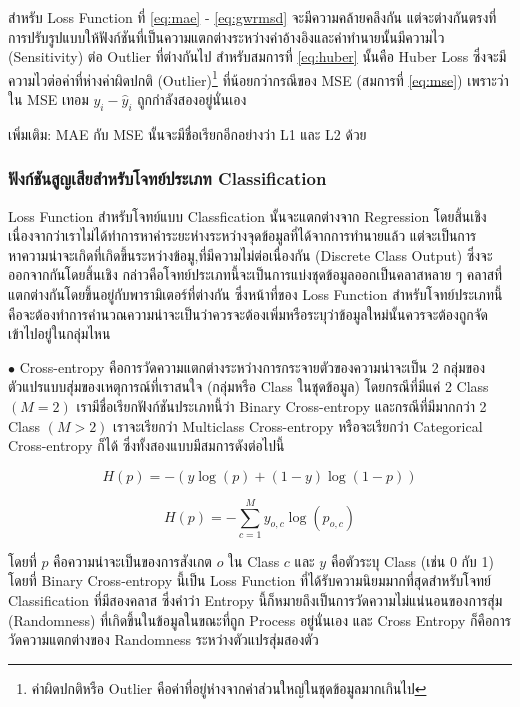สำหรับ Loss Function ที่ \eqref{eq:mae} - \eqref{eq:gwrmsd} จะมีความคล้ายคลึงกัน แต่จะต่างกันตรงที่การปรับรูปแบบให้ฟังก์ชันที่เป็นความแตกต่างระหว่างค่าอ้างอิงและค่าทำนายนั้นมีความไว (Sensitivity) ต่อ Outlier ที่ต่างกันไป สำหรับสมการที่ \eqref{eq:huber} นั้นคือ Huber Loss ซึ่งจะมีความไวต่อค่าที่ห่างค่าผิดปกติ (Outlier)\footnote{ค่าผิดปกติหรือ Outlier คือค่าที่อยู่ห่างจากค่าส่วนใหญ่ในชุดข้อมูลมากเกินไป} ที่น้อยกว่ากรณีของ MSE (สมการที่ \eqref{eq:mse}) เพราะว่าใน MSE เทอม $y_{i} - \hat{y}_{i}$ ถูกกำลังสองอยู่นั่นเอง

\noindent เพิ่มเติม: MAE กับ MSE นั้นจะมีชื่อเรียกอีกอย่างว่า L1 และ L2 ด้วย

\subsubsection{ฟังก์ชันสูญเสียสำหรับโจทย์ประเภท Classification}
\label{sssec:loss_func_class}

Loss Function สำหรับโจทย์แบบ Classfication นั้นจะแตกต่างจาก Regression โดยสิ้นเชิงเนื่องจากว่าเราไม่ได้ทำการหาค่าระยะห่างระหว่างจุดข้อมูลที่ได้จากการทำนายแล้ว แต่จะเป็นการหาความน่าจะเกิดที่เกิดขึ้นระหว่างข้อมู,ที่มีความไม่ต่อเนื่องกัน (Discrete Class Output) ซึ่งจะออกจากกันโดยสิ้นเชิง กล่าวคือโจทย์ประเภทนี้จะเป็นการแบ่งชุดข้อมูลออกเป็นคลาสหลาย ๆ คลาสที่แตกต่างกันโดยขึ้นอยู่กับพารามิเตอร์ที่ต่างกัน
ซึ่งหน้าที่ของ Loss Function สำหรับโจทย์ประเภทนี้คือจะต้องทำการคำนวณความน่าจะเป็นว่าควรจะต้องเพิ่มหรือระบุว่าข้อมูลใหม่นั้นควรจะต้องถูกจัดเข้าไปอยู่ในกลุ่มไหน

\noindent $\bullet$ Cross-entropy คือการวัดความแตกต่างระหว่างการกระจายตัวของความน่าจะเป็น 2 กลุ่มของตัวแปรแบบสุ่มของเหตุการณ์ที่เราสนใจ (กลุ่มหรือ Class ในชุดข้อมูล) โดยกรณีที่มีแค่ 2 Class $(M = 2)$ เรามีชื่อเรียกฟังก์ชันประเภทนี้ว่า Binary Cross-entropy และกรณีที่มีมากกว่า 2 Class $(M > 2)$ เราจะเรียกว่า Multiclass Cross-entropy หรือจะเรียกว่า Categorical Cross-entropy ก็ได้ ซึ่งทั้งสองแบบมีสมการดังต่อไปนี้

\begin{equation}\label{eq:binary_entro}
    H(p) = -{(y\log(p) + (1 - y)\log(1 - p))}
\end{equation}

\begin{equation}\label{eq:multiclass_entro}
    H(p) = -\sum_{c=1}^My_{o,c}\log(p_{o,c})
\end{equation}

\noindent โดยที่ $p$ คือความน่าจะเป็นของการสังเกต $o$ ใน Class $c$ และ $y$ คือตัวระบุ Class (เช่น 0 กับ 1) โดยที่ Binary
Cross-entropy นี้เป็น Loss Function ที่ได้รับความนิยมมากที่สุดสำหรับโจทย์ Classification ที่มีสองคลาส ซึ่งคำว่า Entropy นี้ก็หมายถึงเป็นการวัดความไม่แน่นอนของการสุ่ม (Randomness) ที่เกิดขึ้นในข้อมูลในขณะที่ถูก Process อยู่นั่นเอง และ Cross Entropy ก็คือการวัดความแตกต่างของ Randomness ระหว่างตัวแปรสุ่มสองตัว

